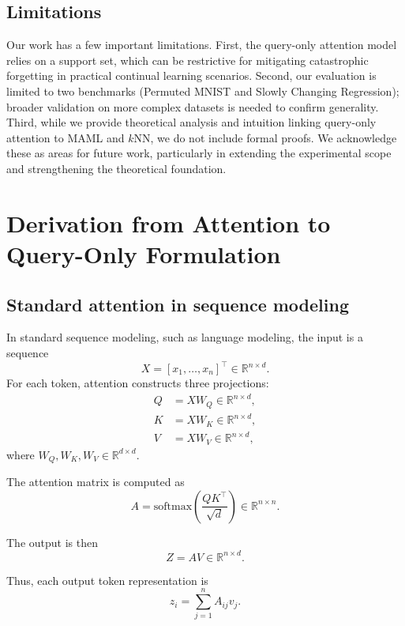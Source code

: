 \documentclass{article}
\begin{document}
\subsection{Limitations}
\label{sec:limitations}
Our work has a few important limitations.  
First, the query-only attention model relies on a support set, which can be restrictive for mitigating catastrophic forgetting in practical continual learning scenarios.  
Second, our evaluation is limited to two benchmarks (Permuted MNIST and Slowly Changing Regression); broader validation on more complex datasets is needed to confirm generality.  
Third, while we provide theoretical analysis and intuition linking query-only attention to MAML and $k$NN, we do not include formal proofs.  
We acknowledge these as areas for future work, particularly in extending the experimental scope and strengthening the theoretical foundation.


\section{Derivation from Attention to Query-Only Formulation}
\label{app:attention-to-query}

\subsection{Standard attention in sequence modeling}

In standard sequence modeling, such as language modeling, the input is a sequence
\[
X = [x_1,\dots,x_n]^\top \in \mathbb{R}^{n \times d}.
\]
For each token, attention constructs three projections:
\begin{align}
Q &= XW_Q \in \mathbb{R}^{n \times d},\\
K &= XW_K \in \mathbb{R}^{n \times d},\\
V &= XW_V \in \mathbb{R}^{n \times d},
\end{align}
where $W_Q,W_K,W_V \in \mathbb{R}^{d \times d}$.

The attention matrix is computed as
\begin{equation}
A = \mathrm{softmax}\left(\frac{QK^\top}{\sqrt{d}}\right)
\in \mathbb{R}^{n \times n}.
\end{equation}

The output is then
\begin{equation}
Z = AV \in \mathbb{R}^{n \times d}.
\end{equation}

Thus, each output token representation is
\begin{equation}
z_i = \sum_{j=1}^{n} A_{ij} v_j.
\end{equation}
\end{document}
